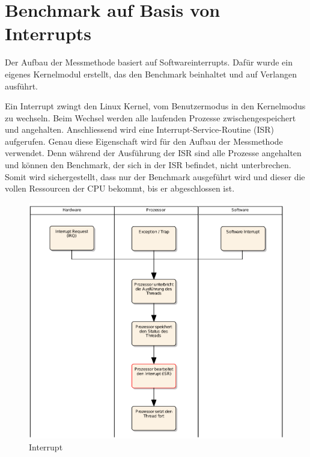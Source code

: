 
\pagebreak
\section{Benchmark auf Basis von Interrupts}
\label{chap:benchmark_basis_interrupts}




Der Aufbau der Messmethode basiert auf Softwareinterrupts. Dafür wurde ein eigenes Kernel\-modul erstellt, das den Benchmark beinhaltet und auf Verlangen ausführt.
\par
Ein Interrupt zwingt den Linux Kernel, vom Benutzermodus in den Kernelmodus zu wechseln\cite{Mandl2010_3}. Beim Wechsel werden alle laufenden Prozesse zwischengespeichert und angehalten. Anschliessend wird eine Interrupt-Service-Routine (ISR) aufgerufen. Genau diese Eigenschaft wird für den Aufbau der Messmethode verwendet. Denn während der Ausführung der ISR sind alle Prozesse angehalten und können den Benchmark, der sich in der ISR befindet, nicht unterbrechen. Somit wird sichergestellt, dass nur der Benchmark ausgeführt wird und dieser die vollen Ressourcen der CPU bekommt, bis er abgeschlossen ist.
\par

\begin{figure}
\centering
\includegraphics[scale=0.45]{images/interrupt_ea.pdf}
\caption{Interrupt}
\label{fig:Interrupt}
\end{figure}

